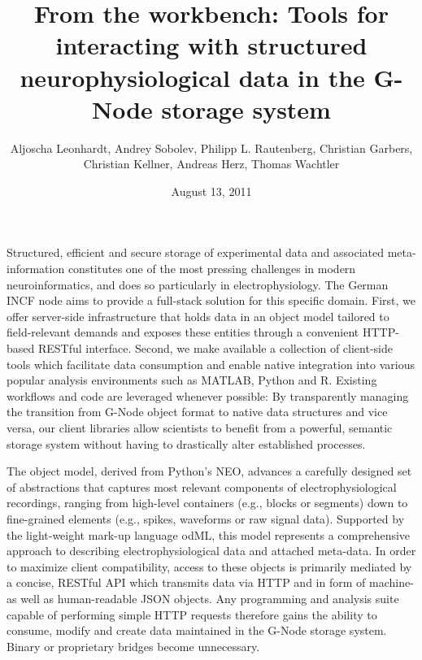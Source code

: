 \documentclass[a4paper]{article}
\begin{document}
\title{From the workbench: Tools for interacting with structured
  neurophysiological data in the G-Node storage system}

\author{

  Aljoscha Leonhardt,
  Andrey Sobolev,
  Philipp L. Rautenberg,
  Christian Garbers,
  Christian Kellner,
  Andreas Herz,
  Thomas Wachtler

}
\date{August 13, 2011}

\maketitle


Structured, efficient and secure storage of experimental data and
associated meta-information constitutes one of the most pressing
challenges in modern neuroinformatics, and does so particularly in
electrophysiology. The German INCF node aims to provide a full-stack
solution for this specific domain. First, we offer server-side
infrastructure that holds data in an object model tailored to
field-relevant demands and exposes these entities through a convenient
HTTP-based RESTful interface. Second, we make available a collection of client-side
tools which facilitate data consumption and enable native integration into
various popular analysis environments such as MATLAB, Python and
R. Existing workflows and code are leveraged whenever possible: By
transparently managing the transition from G-Node object format to
native data structures and vice versa, our client libraries allow
scientists to benefit from a powerful, semantic storage system without
having to drastically alter established processes.

The object model, derived from Python's NEO, advances a carefully
designed set of abstractions that captures most relevant components
of electrophysiological recordings, ranging from high-level
containers (e.g., blocks or segments) down to fine-grained elements
(e.g., spikes, waveforms or raw signal data). Supported by the
light-weight mark-up language odML, this model represents a
comprehensive approach to describing electrophysiological data and
attached meta-data. In order to maximize client compatibility, access
to these objects is primarily mediated by a concise, RESTful API which
transmits data via HTTP and in form of machine- as well as
human-readable JSON objects. Any programming and analysis suite
capable of performing simple HTTP requests therefore gains the ability
to consume, modify and create data maintained in the G-Node storage
system. Binary or proprietary bridges become unnecessary.
\end{document}
